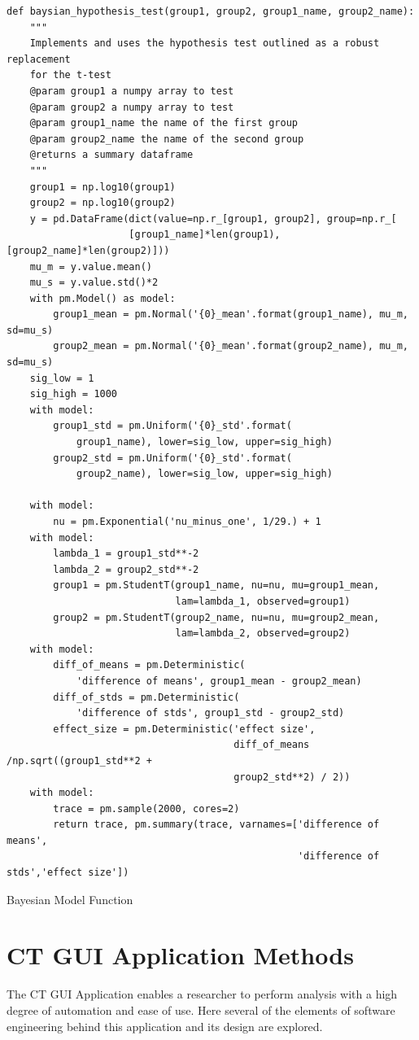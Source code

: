 \documentclass[11pt]{report}
\begin{document}
\begin{listing}[htbp]
\begin{verbatim}
def baysian_hypothesis_test(group1, group2, group1_name, group2_name):
    """
    Implements and uses the hypothesis test outlined as a robust replacement
    for the t-test
    @param group1 a numpy array to test
    @param group2 a numpy array to test
    @param group1_name the name of the first group
    @param group2_name the name of the second group
    @returns a summary dataframe
    """
    group1 = np.log10(group1)
    group2 = np.log10(group2)
    y = pd.DataFrame(dict(value=np.r_[group1, group2], group=np.r_[
                     [group1_name]*len(group1), [group2_name]*len(group2)]))
    mu_m = y.value.mean()
    mu_s = y.value.std()*2
    with pm.Model() as model:
        group1_mean = pm.Normal('{0}_mean'.format(group1_name), mu_m, sd=mu_s)
        group2_mean = pm.Normal('{0}_mean'.format(group2_name), mu_m, sd=mu_s)
    sig_low = 1
    sig_high = 1000
    with model:
        group1_std = pm.Uniform('{0}_std'.format(
            group1_name), lower=sig_low, upper=sig_high)
        group2_std = pm.Uniform('{0}_std'.format(
            group2_name), lower=sig_low, upper=sig_high)

    with model:
        nu = pm.Exponential('nu_minus_one', 1/29.) + 1
    with model:
        lambda_1 = group1_std**-2
        lambda_2 = group2_std**-2
        group1 = pm.StudentT(group1_name, nu=nu, mu=group1_mean,
                             lam=lambda_1, observed=group1)
        group2 = pm.StudentT(group2_name, nu=nu, mu=group2_mean,
                             lam=lambda_2, observed=group2)
    with model:
        diff_of_means = pm.Deterministic(
            'difference of means', group1_mean - group2_mean)
        diff_of_stds = pm.Deterministic(
            'difference of stds', group1_std - group2_std)
        effect_size = pm.Deterministic('effect size',
                                       diff_of_means /np.sqrt((group1_std**2 +
                                       group2_std**2) / 2))
    with model:
        trace = pm.sample(2000, cores=2)
        return trace, pm.summary(trace, varnames=['difference of means',
                                                  'difference of stds','effect size'])
\end{verbatim}
\caption{\label{org66483cb}
Bayesian Model Function}
\end{listing}


\clearpage


\section{CT GUI Application Methods}
\label{sec:org2e9d5ff}
The CT GUI Application enables a researcher to perform analysis with a high degree of automation and ease of use. Here several of the elements of software engineering behind this application and its design are explored.
\end{document}
